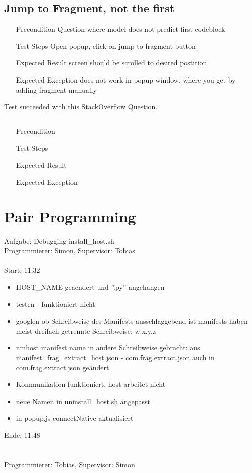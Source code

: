 \documentclass{report}
\begin{document}
\subsection*{Jump to Fragment, not the first}
\begin{itemize}
	\item[Precondition] Question where model does not predict first codeblock
	\item[Test Steps] Open popup, click on jump to fragment button
	\item[Expected Result] screen should be scrolled to desired postition
	\item[Expected Exception] does not work in popup window, where you get by adding fragment manually
\end{itemize}
Test succeeded with this \href{https://stackoverflow.com/questions/221294/how-do-you-get-a-timestamp-in-javascript?rq=1}{StackOverflow Question}.

\subsection*{}
\begin{itemize}
	\item[Precondition]
	\item[Test Steps]
	\item[Expected Result]
	\item[Expected Exception]
\end{itemize}

\section*{Pair Programming}
\Large Aufgabe: Debugging install\_host.sh\\ \normalsize
Programmierer: Simon, Supervisor: Tobias\\
\\
Start: 11:32
\begin{itemize}
	\item HOST\_NAME geaendert und ''.py'' angehangen
	\item testen - funktioniert nicht
	\item googlen ob Schreibweise des Manifests ausschlaggebend ist
		\subitem manifests haben meist dreifach getrennte Schreibweise: w.x.y.z
	\item nmhost manifest name in andere Schreibweise gebracht:
		\subitem aus manifest\_frag\_extract\_host.json - com.frag.extract.json
		\subitem auch in com.frag.extract.json geändert
	\item Kommunikation funktioniert, host arbeitet nicht
	\item neue Namen in uninstall\_host.sh angepasst
	\item in popup.js connectNative aktualisiert
\end{itemize}
Ende: 11:48\\
\\\\
Programmierer: Tobias, Supervisor: Simon\\
\end{document}
